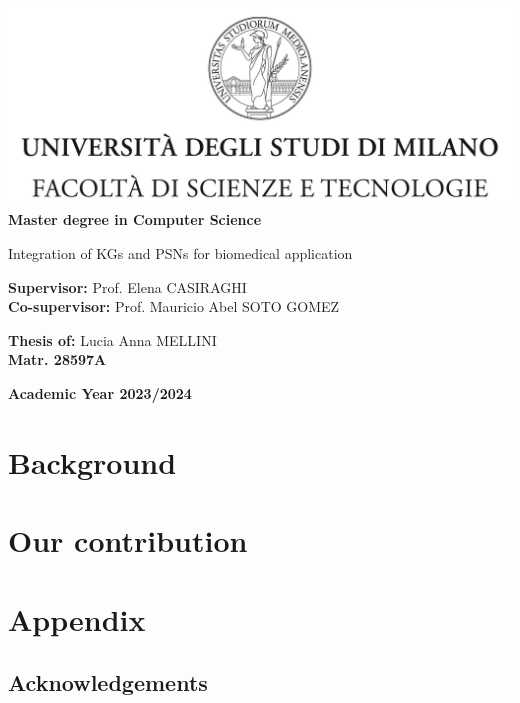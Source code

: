 \documentclass[12pt,a4paper]{report}
\theoremstyle{definition}
\begin{document}
\begin{titlepage}
    \begin{center}
    \includegraphics[width=\textwidth]{Logo.jpg}\\
    {\Large{\bf Master degree in Computer Science}}
    \end{center}
    \vspace{12mm}
    \begin{center}
        \begin{doublespace}
            {\huge Integration of KGs and PSNs for biomedical application}
        \end{doublespace}
    
    \end{center}
    \vspace{12mm}
    \begin{flushleft}
    {\large{\bf Supervisor:}}
    {\large{Prof. Elena CASIRAGHI}}\\
    \vspace{4mm}
    {\large{\bf Co-supervisor:}}
    {\large{Prof. Mauricio Abel SOTO GOMEZ}}\\
    \end{flushleft}
    \vspace{12mm}
    \begin{flushright}
    {\large{\bf Thesis of:}}
    {\large{Lucia Anna MELLINI}}\\
    {\large{\bf Matr. 28597A}}\\
    \end{flushright}
    \vspace{4mm}
    \begin{center}
    {\large{\bf Academic Year 2023/2024}}
    \end{center}
\end{titlepage}
    
\tableofcontents
   

\part{Background}



\part{Our contribution}







\appendix
\cleardoublepage
\part*{Appendix}


\chapter*{Acknowledgements}
\end{document}
